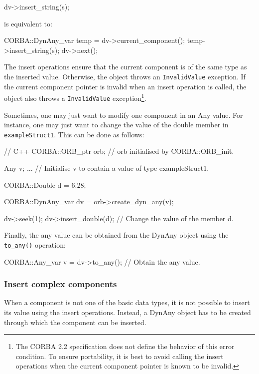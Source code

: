 \documentclass[11pt,twoside,a4paper]{book}
\newcommand{\type}[1]{\texttt{#1}}
\newcommand{\code}[1]{\texttt{#1}}
\newcommand{\op}[1]{\texttt{#1()}}
\begin{document}
\begin{cxxlisting}
dv->insert_string(s);
\end{cxxlisting}

is equivalent to:

\begin{cxxlisting}
CORBA::DynAny_var temp = dv->current_component();
temp->insert_string(s);
dv->next();
\end{cxxlisting}

The insert operations ensure that the current component is of the same
type as the inserted value. Otherwise, the object throws an
\code{InvalidValue} exception. If the current component pointer is
invalid when an insert operation is called, the object also throws a
\code{InvalidValue} exception\footnote{The CORBA 2.2 specification
does not define the behavior of this error condition. To ensure
portability, it is best to avoid calling the insert operations when
the current component pointer is known to be invalid.}.

Sometimes, one may just want to modify one component in an Any
value. For instance, one may just want to change the value of the
double member in \type{exampleStruct1}. This can be done as follows:

\begin{cxxlisting}
// C++
CORBA::ORB_ptr orb;  // orb initialised by CORBA::ORB_init.

Any v;
...       // Initialise v to contain a value of type exampleStruct1.

CORBA::Double d = 6.28;

CORBA::DynAny_var dv = orb->create_dyn_any(v);

dv->seek(1);
dv->insert_double(d);    // Change the value of the member d.
\end{cxxlisting}

Finally, the any value can be obtained from the DynAny object using
the \op{to\_any} operation:

\begin{cxxlisting}
CORBA::Any_var v = dv->to_any();    // Obtain the any value.
\end{cxxlisting}


\subsubsection{Insert complex components}

When a component is not one of the basic data types, it is not
possible to insert its value using the insert operations. Instead, a
DynAny object has to be created through which the component can be
inserted.
\end{document}
